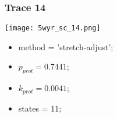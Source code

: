 \subsubsection{Trace 14}
\begin{minipage}[c]{0.7\textwidth}
    \texttt{[image: 5wyr\_sc\_14.png]}
\end{minipage}
\hfill
\begin{minipage}[c]{0.45\textwidth}
    \begin{itemize}
        \item method = 'stretch-adjust';
        \item $p_{prot}=0.7441$;
        \item $k_{prot}=0.0041$;
        \item states = 11;
    \end{itemize}
\end{minipage}

